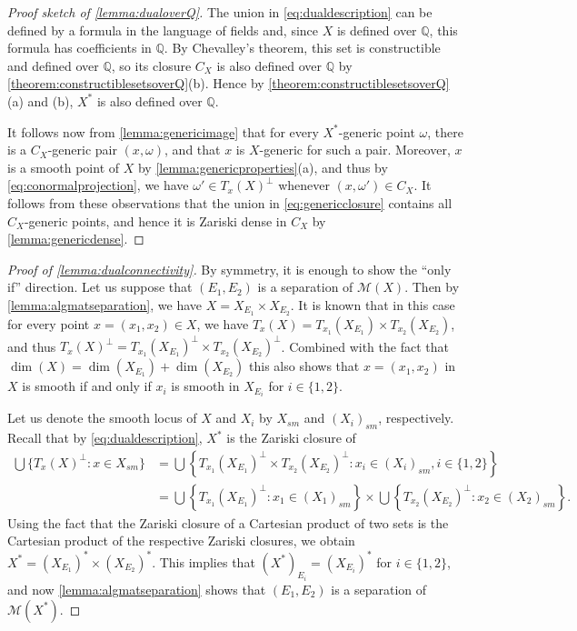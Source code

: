 \documentclass[11pt,a4paper,dvipsnames]{scrartcl}
\theoremstyle{definition}
\newcommand{\QQ}{\mathbb{Q}}
\newcommand{\algmat}[1]{\mathcal{M}(#1)}
\begin{document}
\begin{proof}[Proof sketch of \cref{lemma:dualoverQ}]
    The union in \cref{eq:dualdescription} can be defined by a formula in the language of fields and, since $X$ is defined over $\QQ$, this formula has coefficients in $\QQ$. By Chevalley's theorem, this set is constructible and defined over $\QQ$, so its closure $C_X$ is also defined over $\QQ$ by \cref{theorem:constructiblesetsoverQ}(b). Hence by \cref{theorem:constructiblesetsoverQ}(a) and (b), $X^*$ is also defined over $\QQ$. 
    
    It follows now from \cref{lemma:genericimage} that for every $X^*$-generic point $\omega$, there is a $C_X$-generic pair $(x,\omega)$, and that $x$ is $X$-generic for such a pair. Moreover, $x$ is a smooth point of $X$ by \cref{lemma:genericproperties}(a), and thus by \cref{eq:conormalprojection}, we have $\omega' \in {T_x(X)}^\perp$ whenever $(x,\omega') \in C_X$. It follows from these observations that the union in \cref{eq:genericclosure} contains all $C_X$-generic points, and hence it is Zariski dense in $C_X$ by \cref{lemma:genericdense}.  
\end{proof}

\begin{proof}[Proof of \cref{lemma:dualconnectivity}]
    By symmetry, it is enough to show the ``only if'' direction. Let us suppose that $(E_1,E_2)$ is a separation of $\algmat{X}$. Then by \cref{lemma:algmatseparation}, we have $X = X_{E_1} \times X_{E_2}$. It is known that in this case for every point $x = (x_1,x_2) \in X$, we have $T_x(X) = T_{x_1}(X_{E_1}) \times T_{x_2}(X_{E_2})$, and thus ${T_x(X)}^\perp = {T_{x_1}(X_{E_1})}^\perp \times {T_{x_2}(X_{E_2})}^\perp$. Combined with the  fact that $\dim(X) = \dim(X_{E_1}) + \dim(X_{E_2})$ this also shows that $x = (x_1,x_2)$ in $X$ is smooth if and only if $x_i$ is smooth in $X_{E_i}$ for $i \in \{1,2\}$. 
    
    Let us denote the smooth locus of $X$ and $X_i$ by $X_{sm}$ and ${(X_i)}_{sm}$, respectively.
    Recall that by \cref{eq:dualdescription}, $X^*$ is the Zariski closure of
    \begin{align*}
        \bigcup \{{T_{x}(X)}^\perp : x \in X_{sm}\}  
        &= \bigcup \left\{{T_{x_1}(X_{E_1})}^\perp \times {T_{x_2}(X_{E_2})}^\perp : x_i \in {(X_i)}_{sm}, i \in \{1,2\}\right\} \\
        &= \bigcup \left\{{T_{x_1}(X_{E_1})}^\perp : x_1 \in {(X_1)}_{sm}\right\} \times \bigcup \left\{{T_{x_2}(X_{E_2})}^\perp : x_2 \in {(X_2)}_{sm}\right\}.
    \end{align*}
    Using the fact that the Zariski closure of a Cartesian product of two sets is the Cartesian product of the respective Zariski closures, we obtain $X^* = {(X_{E_1})}^* \times {(X_{E_2})}^*$. This implies that ${(X^*)}_{E_i} = {(X_{E_i})}^*$ for $i \in \{1,2\}$, and now \cref{lemma:algmatseparation} shows that $(E_1,E_2)$ is a separation of $\algmat{X^*}$.
\end{proof}
\end{document}
